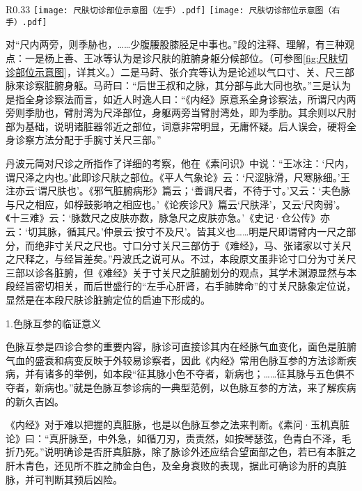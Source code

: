 \documentclass[12pt]{ctexbook}
\begin{document}


\begin{wrapfigure}[16]{R}{0.33\textwidth} %
	\centering
		{\texttt{[image: 尺肤切诊部位示意图（左手）.pdf]}}
	\hspace{3mm}
		{\texttt{[image: 尺肤切诊部位示意图（右手）.pdf]}}
	\caption{尺肤切诊部位示意图}
	\label{fig:尺肤切诊部位示意图} %
\end{wrapfigure}
对“尺内两旁，则季胁也，……少腹腰股膝胫足中事也。”段的注释、理解，有三种观点：一是杨上善、王冰等认为是诊尺肤的脏腑身躯分候部位。（可参图\ref{fig:尺肤切诊部位示意图}，详其义。）二是马莳、张介宾等认为是论述以气口寸、关、尺三部脉来诊察脏腑身躯。马莳曰：“后世王叔和之脉，其分部与此大同也欤。”三是认为是指全身诊察法而言，如近人时逸人曰：“《内经》原意系全身诊察法，所谓尺内两旁则季肋也，臂肘湾为尺泽部位，身躯两旁当臂肘湾处，即为季肋。其余则以尺肘部为基础，说明诸脏器邻近之部位，词意非常明显，无庸怀疑。后人误会，硬将全身诊察方法分配于手腕寸关尺三部。”

丹波元简对尺诊之所指作了详细的考察，他在《素问识》中说：“王冰注：‘尺内，谓尺泽之内也。’此即诊尺肤之部位。《平人气象论》云：‘尺涩脉滑，尺寒脉细。’王注亦云‘谓尺肤也’。《邪气脏腑病形》篇云；‘善调尺者，不待于寸。’又云：‘夫色脉与尺之相应，如桴鼓影响之相应也。’《论疾诊尺》篇云‘尺肤泽’，又云‘尺肉弱’。《十三难》云：‘脉数尺之皮肤亦数，脉急尺之皮肤亦急。’《史记·仓公传》亦云：‘切其脉，循其尺。’仲景云‘按寸不及尺’。皆其义也……明是尺即谓臂内一尺之部分，而绝非寸关尺之尺也。寸口分寸关尺三部仿于《难经》，马、张诸家以寸关尺之尺释之，与经旨差矣。”丹波氏之说可从。不过，本段原文虽非论寸口分为寸关尺三部以诊各脏腑，但《难经》关于寸关尺之脏腑划分的观点，其学术渊源显然与本段经旨密切相关，而后世盛行的“左手心肝肾，右手肺脾命”的寸关尺脉象定位说，显然是在本段尺肤诊脏腑定位的启迪下形成的。


1.色脉互参的临证意义

色脉互参是四诊合参的重要内容，脉诊可直接诊其内在经脉气血变化，面色是脏腑气血的盛衰和病变反映于外较易诊察者，因此《内经》常用色脉互参的方法诊断疾病，并有诸多的举例，如本段“征其脉小色不夺者，新病也；……征其脉与五色俱不夺者，新病也。”就是色脉互参诊病的一典型范例，以色脉互参的方法，来了解疾病的新久吉凶。

《内经》对于难以把握的真脏脉，也是以色脉互参之法来判断。《素问·玉机真脏论》曰：“真肝脉至，中外急，如循刀刃，责责然，如按琴瑟弦，色青白不泽，毛折乃死。”说明确诊是否肝真脏脉，除了脉诊外还应结合望面部之色，若已有本脏之肝木青色，还见所不胜之肺金白色，及全身衰败的表现，据此可确诊为肝的真脏脉，并可判断其预后凶险。
\end{document}

